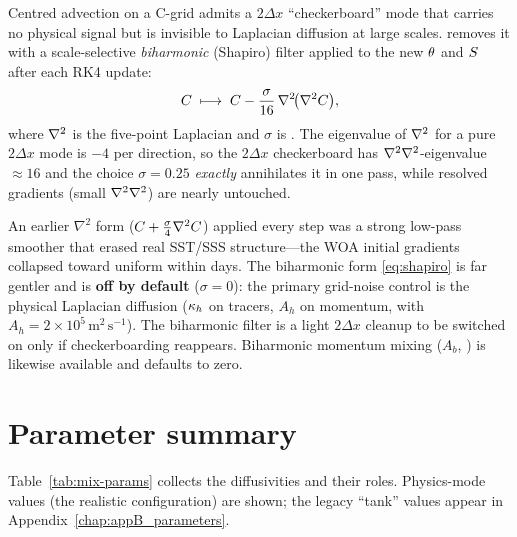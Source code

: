 Centred advection on a C-grid admits a $2\Delta x$ ``checkerboard'' mode that carries
no physical signal but is invisible to Laplacian diffusion at large scales. \model{}
removes it with a scale-selective \emph{biharmonic} (Shapiro) filter \citep{shapiro1970} applied to the
new $\theta$ and $S$ after each RK4 update:
\begin{equation}
C \;\longmapsto\; C - \frac{\sigma}{16}\,\nabla^{2}\!\big(\nabla^{2} C\big),
\label{eq:shapiro}
\end{equation}
where $\nabla^{2}$ is the five-point Laplacian and $\sigma$ is .
The eigenvalue of $\nabla^{2}$ for a pure $2\Delta x$ mode is $-4$ per direction, so the
$2\Delta x$ checkerboard has $\nabla^{2}\nabla^{2}$-eigenvalue $\approx 16$ and the choice $\sigma=0.25$
\emph{exactly} annihilates it in one pass, while resolved gradients (small
$\nabla^{2}\nabla^{2}$) are nearly untouched.

\begin{remark}
An earlier $\nabla^2$ form ($C+\tfrac{\sigma}{4}\nabla^{2} C$) applied every step was a
strong low-pass smoother that erased real SST/SSS structure---the WOA initial
gradients collapsed toward uniform within days. The biharmonic form
\eqref{eq:shapiro} is far gentler and is \textbf{off by default}
($\sigma=0$): the primary grid-noise control is the physical Laplacian diffusion
($\kappa_{h}$ on tracers, $A_h$ on momentum, with $A_h=2\times10^5\,\mathrm{m^2\,s^{-1}}$).
The biharmonic filter is a light $2\Delta x$ cleanup to be switched on only if
checkerboarding reappears. Biharmonic momentum mixing ($A_b$, ) is
likewise available and defaults to zero.
\end{remark}

\section{Parameter summary}

Table~\ref{tab:mix-params} collects the diffusivities and their roles. Physics-mode
values (the realistic configuration) are shown; the legacy ``tank'' values appear in
Appendix~\ref{chap:appB_parameters}.


